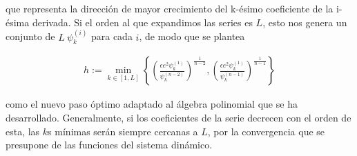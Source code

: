 que representa la dirección de mayor crecimiento del k-ésimo coeficiente de la i-ésima derivada. Si el orden al que expandimos las series es $L$, esto nos genera un conjunto de $L \ \psi_k^{(i)}$  para cada $i$, de modo que se plantea 

\begin{align*}
 h := \min_{k \in [1,L]}{ \left\lbrace \left(\frac{ \epsilon e^2 \psi_k^{(1)} }{ \psi_k^{(n-2)}}\right)^{  \frac{1}{n-2} } , \left(\frac{ \epsilon e^2 \psi_k^{(1)}}{ \psi_k^{(n-1)}}\right)^{ \frac{1}{n-1} }  \right\rbrace }
\end{align*}

como el nuevo paso óptimo adaptado al álgebra polinomial que se ha desarrollado. Generalmente, si los coeficientes de la serie decrecen con el orden de esta, las $k$s mínimas serán siempre cercanas a $L$, por la convergencia que se presupone de las funciones del sistema dinámico.

